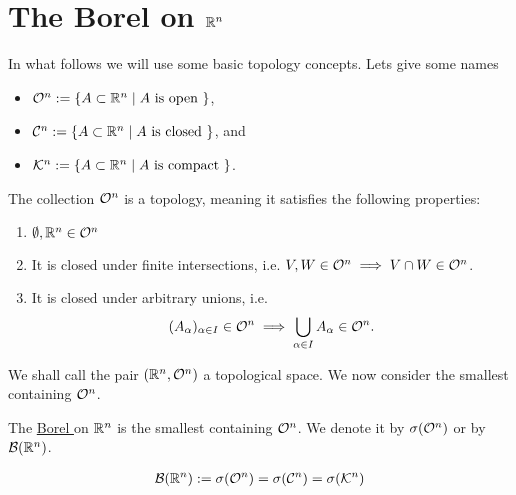 \section{The Borel \siga on $\mathbb{R}^n$}

In what follows we will use some basic topology concepts. Lets give some names
\begin{itemize}
	\item $\mathcal{O}^n := \{A \subset \mathbb{R}^n \mid A \text{ is open }\}$,
	\item $\mathcal{C}^n := \{A \subset \mathbb{R}^n \mid A \text{ is closed }\}$, and
	\item $\mathcal{K}^n := \{A \subset \mathbb{R}^n \mid A \text{ is compact }\}$.
\end{itemize}

The collection $\mathcal{O}^n$ is a topology, meaning it satisfies the following properties:
\begin{enumerate}
	\item $\emptyset, \mathbb{R}^n \in \mathcal{O}^n$
	\item It is closed under finite intersections, i.e. $V, W \in \mathcal{O}^n \implies V \cap W \in \mathcal{O}^n$.
	\item It is closed under arbitrary unions, i.e.
	\begin{align*}
		(A_\alpha)_{\alpha \in I} \in \mathcal{O}^n \implies \bigcup_{\alpha \in I} A_\alpha \in \mathcal{O}^n.
	\end{align*}
\end{enumerate}

We shall call the pair $(\mathbb{R}^n, \mathcal{O}^n)$ a topological space. We now consider the smallest \siga containing $\mathcal{O}^n$.

\begin{dfn}
	The \underline{Borel \siga} on $\mathbb{R}^n$ is the smallest \siga containing $\mathcal{O}^n$. We denote it by $\sigma(\mathcal{O}^n)$ or by $\mathcal{B}(\mathbb{R}^n)$.
\end{dfn}

\begin{thm}
	\begin{align*}
		\mathcal{B}(\mathbb{R}^n) := \sigma(\mathcal{O}^n) = \sigma(\mathcal{C}^n) = \sigma(\mathcal{K}^n)
	\end{align*}
\end{thm}

